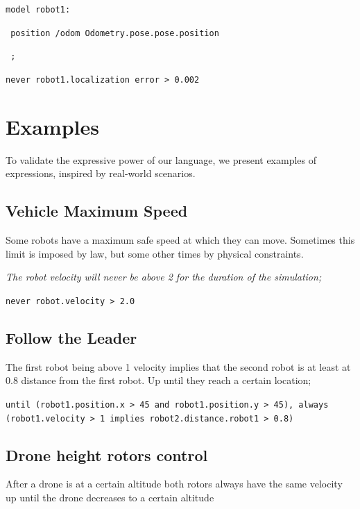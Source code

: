 \documentclass[runningheads]{llncs}
\begin{document}
\vspace{2mm}

\texttt{model robot1:}

\texttt{    position /odom Odometry.pose.pose.position}

\texttt{    ;}

\vspace{2mm}

\texttt{never robot1.localization error > 0.002}


\section{Examples}

To validate the expressive power of our language, we present examples of expressions, inspired by real-world scenarios.


\subsection{Vehicle Maximum Speed}

Some robots have a maximum safe speed at which they can move. Sometimes this limit is imposed by law, but some other times by physical constraints.


\textit{The robot velocity will never be above 2 for the duration of the simulation;}

\vspace{2mm}

\texttt{never robot.velocity > 2.0}

\subsection{Follow the Leader}

The first robot being above 1 velocity implies that the second robot is at least at 0.8 distance from the first robot. Up until they reach a certain location;

\vspace{2mm}

\texttt{until (robot1.position.x > 45 and robot1.position.y > 45), always (robot1.velocity > 1 implies robot2.distance.robot1 > 0.8)}


\subsection{Drone height rotors control}

After a drone is at a certain altitude both rotors always have the same velocity up until the drone decreases to a certain altitude
\end{document}
